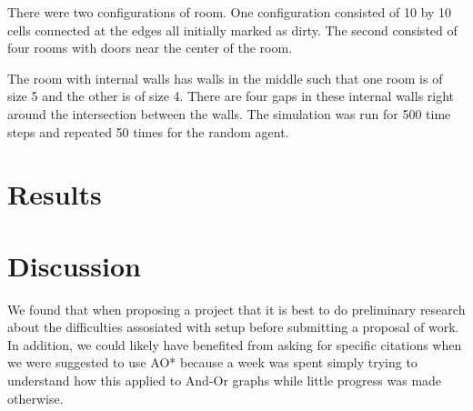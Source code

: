 \documentclass{article}
\begin{document}
There were two configurations of room. One configuration consisted of 10 by 10 cells connected at the edges  all initially marked as dirty. The second consisted of four rooms with doors near the center of the room. 


The room with internal walls has walls in the middle such that one room is of size 5 and the other is of size 4. There are four gaps in these internal walls right around the intersection between the walls.  The simulation was run for 500 time steps and repeated 50 times for the random agent. 




\section{Results}


\section{Discussion}
We found that when proposing a project that it is best to do preliminary research about the difficulties assosiated with setup before submitting a proposal of work. In addition, we could likely have benefited from asking for specific citations when we were suggested to use AO* because a week was spent simply trying to understand how this applied to And-Or graphs while little progress was made otherwise. 
\end{document}
